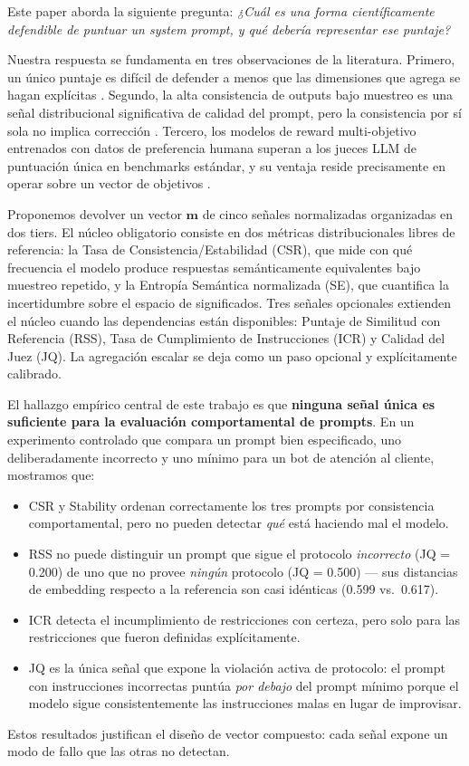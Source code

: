 \documentclass[11pt,a4paper]{article}
\begin{document}
Este paper aborda la siguiente pregunta: \textit{¿Cuál es una forma científicamente defendible de puntuar un system prompt, y qué debería representar ese puntaje?}

Nuestra respuesta se fundamenta en tres observaciones de la literatura. Primero, un único puntaje es difícil de defender a menos que las dimensiones que agrega se hagan explícitas \citep{unieval2022}. Segundo, la alta consistencia de outputs bajo muestreo es una señal distribucional significativa de calidad del prompt, pero la consistencia por sí sola no implica corrección \citep{selfconsistency2023, glape2024}. Tercero, los modelos de reward multi-objetivo entrenados con datos de preferencia humana superan a los jueces LLM de puntuación única en benchmarks estándar, y su ventaja reside precisamente en operar sobre un vector de objetivos \citep{armorm2024}.

Proponemos devolver un vector $\mathbf{m}$ de cinco señales normalizadas organizadas en dos tiers. El núcleo obligatorio consiste en dos métricas distribucionales libres de referencia: la Tasa de Consistencia/Estabilidad (CSR), que mide con qué frecuencia el modelo produce respuestas semánticamente equivalentes bajo muestreo repetido, y la Entropía Semántica normalizada (SE), que cuantifica la incertidumbre sobre el espacio de significados. Tres señales opcionales extienden el núcleo cuando las dependencias están disponibles: Puntaje de Similitud con Referencia (RSS), Tasa de Cumplimiento de Instrucciones (ICR) y Calidad del Juez (JQ). La agregación escalar se deja como un paso opcional y explícitamente calibrado.

El hallazgo empírico central de este trabajo es que \textbf{ninguna señal única es suficiente para la evaluación comportamental de prompts}. En un experimento controlado que compara un prompt bien especificado, uno deliberadamente incorrecto y uno mínimo para un bot de atención al cliente, mostramos que:
\begin{itemize}[noitemsep]
    \item CSR y Stability ordenan correctamente los tres prompts por consistencia comportamental, pero no pueden detectar \textit{qué} está haciendo mal el modelo.
    \item RSS no puede distinguir un prompt que sigue el protocolo \textit{incorrecto} (JQ = 0.200) de uno que no provee \textit{ningún} protocolo (JQ = 0.500) --- sus distancias de embedding respecto a la referencia son casi idénticas (0.599 vs.\ 0.617).
    \item ICR detecta el incumplimiento de restricciones con certeza, pero solo para las restricciones que fueron definidas explícitamente.
    \item JQ es la única señal que expone la violación activa de protocolo: el prompt con instrucciones incorrectas puntúa \textit{por debajo} del prompt mínimo porque el modelo sigue consistentemente las instrucciones malas en lugar de improvisar.
\end{itemize}
Estos resultados justifican el diseño de vector compuesto: cada señal expone un modo de fallo que las otras no detectan.
\end{document}
